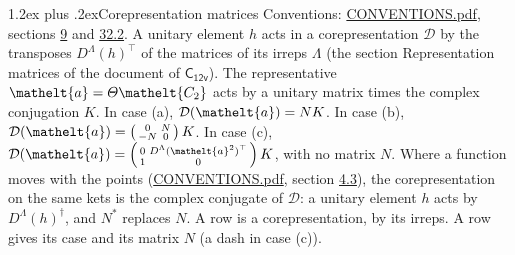 \documentclass[10pt,a4paper]{article}
\makeatletter
\renewcommand\section{\@startsection{section}{1}{\z@}{-3ex plus -1ex minus -.2ex}%
  {1.2ex plus .2ex}{\normalfont\large\sffamily\bfseries\color{parttitle}}}
\numberwithin{equation}{section}
\newcommand{\eltfont}[1]{{\let\sigma\eltsigma\mathelt{#1}}}
\newcommand{\grp}[1]{\mathsf{#1}}
\newcommand{\elt}[1]{\eltfont{#1}}
\makeatother
\begin{document}
\section{Corepresentation matrices}\label{s:corep_matrices}
Conventions: \href{../../CONVENTIONS.pdf}{CONVENTIONS.pdf}, sections \href{../../../rotation/CONVENTIONS.pdf\#conv.9}{9} and \href{../../CONVENTIONS.pdf\#conv.32.2}{32.2}.
A unitary element $h$ acts in a corepresentation $\mathcal{D}$ by the transposes $D^{\Lambda}(h)^{\top}$ of the matrices of its irreps $\Lambda$ (the section Representation matrices of the document of \href{../../../rotation/data/pdf/C12v.pdf}{$\grp{C_{12v}}$}). The representative $\elt{a} = \varTheta\elt{C_{2}}$ acts by a unitary matrix times the complex conjugation $K$.
In case (a), $\mathcal{D}(\elt{a}) = NK$. In case (b), $\mathcal{D}(\elt{a}) = \left(\begin{smallmatrix} 0 & N \\ -N & 0 \end{smallmatrix}\right) K$. In case (c), $\mathcal{D}(\elt{a}) = \left(\begin{smallmatrix} 0 & D^{\Lambda}(\elt{a}^2)^{\top} \\ 1 & 0 \end{smallmatrix}\right) K$, with no matrix $N$.
Where a function moves with the points (\href{../../CONVENTIONS.pdf}{CONVENTIONS.pdf}, section \href{../../../rotation/CONVENTIONS.pdf\#conv.4.3}{4.3}), the corepresentation on the same kets is the complex conjugate of $\mathcal{D}$: a unitary element $h$ acts by $D^{\Lambda}(h)^{\dagger}$, and $N^{*}$ replaces $N$.
A row is a corepresentation, by its irreps. A row gives its case and its matrix $N$ (a dash in case (c)).
\end{document}
